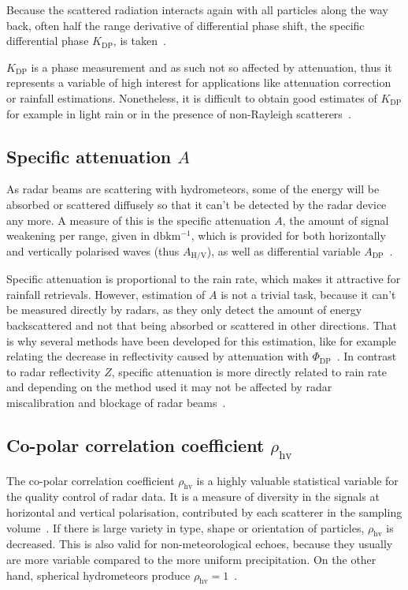 Because the scattered radiation interacts again with all particles along the way back, often half the range derivative of differential phase shift, the specific differential phase $K_\text{DP}$, is taken~\cite{kumjian2013principles}.

$K_\text{DP}$ is a phase measurement and as such not so affected by attenuation, thus it represents a variable of high interest for applications like attenuation correction or rainfall estimations. Nonetheless, it is difficult to obtain good estimates of $K_\text{DP}$ for example in light rain or in the presence of non-Rayleigh scatterers~\cite{kumjian2013principles}.

\subsection{Specific attenuation $A$}
As radar beams are scattering with hydrometeors, some of the energy will be absorbed or scattered diffusely so that it can't be detected by the radar device any more.
A measure of this is the specific attenuation $A$, the amount of signal weakening per range, given in $\si{\decibel \kilo\metre^{-1}}$, which is provided for both horizontally and vertically polarised waves (thus $A_\text{H/V}$), as well as differential variable $A_\text{DP}$~\cite[p.~97]{ryzhkovRadarPolarim}.

Specific attenuation is proportional to the rain rate, which makes it attractive for rainfall retrievals. However, estimation of $A$ is not a trivial task, because it can't be measured directly by radars, as they only detect the amount of energy backscattered and not that being absorbed or scattered in other directions.
That is why several methods have been developed for this estimation, like for example relating the decrease in reflectivity caused by attenuation with $\Phi_\text{DP}$~\cite{bringiAttenuation}. 
In contrast to radar reflectivity $Z$, specific attenuation is more directly related to rain rate and depending on the method used it may not be affected by radar miscalibration and blockage of radar beams~\cite{ryzhkovAttenuation}.

\subsection{Co-polar correlation coefficient $\rho_\text{hv}$} %
The co-polar correlation coefficient $\rho_\text{hv}$ is a highly valuable statistical variable for the quality control of radar data. It is a measure of diversity in the signals at horizontal and vertical polarisation, contributed by each scatterer in the sampling volume~\cite{ryzhkovRadarPolarim, kumjian2013principles}. If there is large variety in type, shape or orientation of particles, $\rho_\text{hv}$ is decreased. This is also valid for non-meteorological echoes, because they usually are more variable compared to the more uniform precipitation. On the other hand, spherical hydrometeors produce $\rho_\text{hv} = 1$~\cite[p.~139]{ryzhkovRadarPolarim}.


